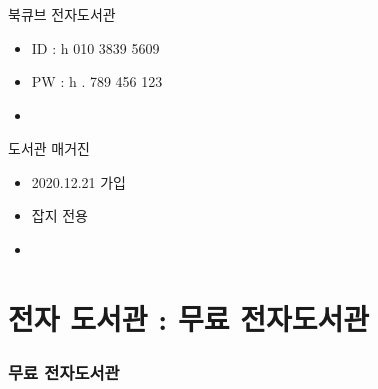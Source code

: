 \documentclass[aspectratio=1610,17pt,xcolor=pdftex,dvipsnames,table,handout]{beamer}
\begin{document}
		\begin{frame} [t,plain]
		\frametitle{}

			\begin{block} {북큐브 전자도서관}
			\setlength{\leftmargini}{4em}			
			\begin{itemize}
				\item ID : h 010 3839 5609
				\item PW : h . 789 456 123
				\item 
			\end{itemize}
			\end{block}						

			\begin{block} {도서관 매거진}
			\setlength{\leftmargini}{4em}			
			\begin{itemize}
				\item 2020.12.21 가입
				\item 잡지 전용
				\item 
			\end{itemize}
			\end{block}						


		\end{frame}						

		\section 	{전자 도서관 : 무료 전자도서관}

		\begin{frame} [t,plain]
		\frametitle{무료 전자도서관}

		\end{frame}						
\end{document}
